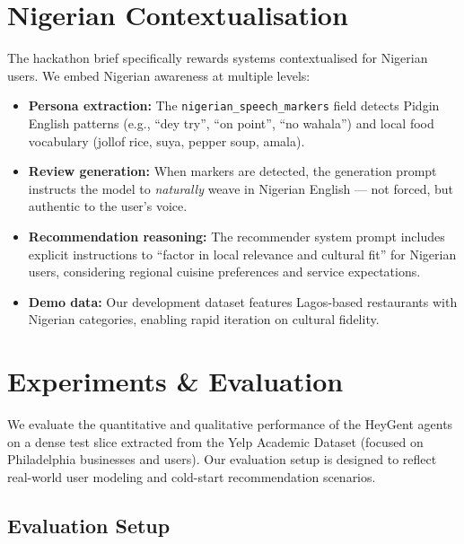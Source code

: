 \documentclass[11pt, a4paper]{article}
\begin{document}
\section{Nigerian Contextualisation}

The hackathon brief specifically rewards systems contextualised for Nigerian users. We embed Nigerian awareness at multiple levels:

\begin{itemize}[leftmargin=2em]
    \item \textbf{Persona extraction:} The \texttt{nigerian\_speech\_markers} field detects Pidgin English patterns (e.g., ``dey try'', ``on point'', ``no wahala'') and local food vocabulary (jollof rice, suya, pepper soup, amala).

    \item \textbf{Review generation:} When markers are detected, the generation prompt instructs the model to \emph{naturally} weave in Nigerian English --- not forced, but authentic to the user's voice.

    \item \textbf{Recommendation reasoning:} The recommender system prompt includes explicit instructions to ``factor in local relevance and cultural fit'' for Nigerian users, considering regional cuisine preferences and service expectations.

    \item \textbf{Demo data:} Our development dataset features Lagos-based restaurants with Nigerian categories, enabling rapid iteration on cultural fidelity.
\end{itemize}

\section{Experiments \& Evaluation}

We evaluate the quantitative and qualitative performance of the HeyGent agents on a dense test slice extracted from the Yelp Academic Dataset (focused on Philadelphia businesses and users). Our evaluation setup is designed to reflect real-world user modeling and cold-start recommendation scenarios.

\subsection{Evaluation Setup}
\end{document}
